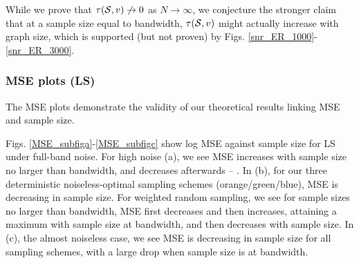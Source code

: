  While we prove that $\tau(\mathcal{S},v) \not\to 0$ as $N \to \infty$, we conjecture the stronger claim that at a sample size equal to bandwidth, $\tau(\mathcal{S},v)$ might actually increase with graph size, which is supported (but not proven) by Figs. \ref{snr_ER_1000}-\ref{snr_ER_3000}.

\subsubsection{MSE plots (LS)}
The MSE plots demonstrate the validity of our theoretical results linking MSE and sample size.

Figs. \ref{MSE_subfiga}-\ref{MSE_subfigc} show log MSE against sample size for LS under full-band noise. %
    For high noise (a), we see MSE increases with sample size no larger than bandwidth, and decreases afterwards -- . %
    In (b), for our three deterministic noiseless-optimal sampling schemes (orange/green/blue), MSE is decreasing in sample size. For weighted random sampling, we see for sample sizes no larger than bandwidth, MSE first decreases and then increases, attaining a maximum with sample size at bandwidth, and then decreases with sample size.
    In (c), the almost noiseless case, we see MSE is decreasing in sample size for all sampling schemes, with a large drop when sample size is at bandwidth.

